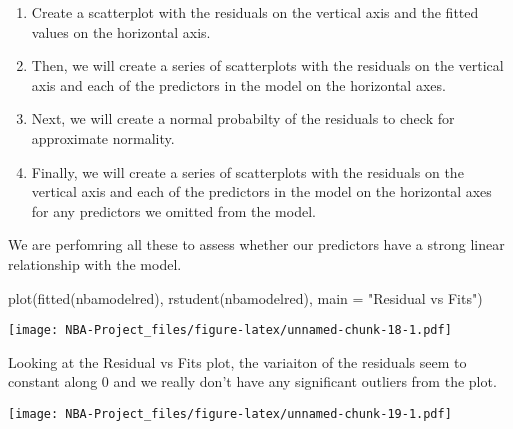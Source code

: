 \documentclass[
]{article}
\newenvironment{Shaded}{\begin{snugshade}}{\end{snugshade}}
\newcommand{\AttributeTok}[1]{\textcolor[rgb]{0.77,0.63,0.00}{#1}}
\newcommand{\FunctionTok}[1]{\textcolor[rgb]{0.00,0.00,0.00}{#1}}
\newcommand{\NormalTok}[1]{#1}
\newcommand{\SpecialCharTok}[1]{\textcolor[rgb]{0.00,0.00,0.00}{#1}}
\newcommand{\StringTok}[1]{\textcolor[rgb]{0.31,0.60,0.02}{#1}}
\begin{document}
\begin{enumerate}
\def\labelenumi{\arabic{enumi}.}
\item
  Create a scatterplot with the residuals on the vertical axis and the
  fitted values on the horizontal axis.
\item
  Then, we will create a series of scatterplots with the residuals on
  the vertical axis and each of the predictors in the model on the
  horizontal axes.
\item
  Next, we will create a normal probabilty of the residuals to check for
  approximate normality.
\item
  Finally, we will create a series of scatterplots with the residuals on
  the vertical axis and each of the predictors in the model on the
  horizontal axes for any predictors we omitted from the model.
\end{enumerate}

We are perfomring all these to assess whether our predictors have a
strong linear relationship with the model.

\begin{Shaded}
\begin{Highlighting}[]
\FunctionTok{plot}\NormalTok{(}\FunctionTok{fitted}\NormalTok{(nbamodelred), }\FunctionTok{rstudent}\NormalTok{(nbamodelred), }\AttributeTok{main =} \StringTok{"Residual vs Fits"}\NormalTok{)}
\end{Highlighting}
\end{Shaded}

\texttt{[image: NBA-Project\_files/figure-latex/unnamed-chunk-18-1.pdf]}

Looking at the Residual vs Fits plot, the variaiton of the residuals
seem to constant along 0 and we really don't have any significant
outliers from the plot.

\begin{Shaded}
\end{Shaded}

\texttt{[image: NBA-Project\_files/figure-latex/unnamed-chunk-19-1.pdf]}

\begin{Shaded}
\end{Shaded}
\end{document}
